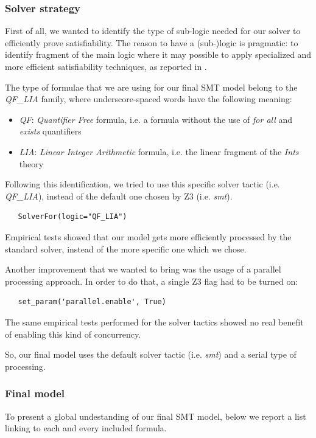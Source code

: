 \documentclass[a4paper,10pt]{article}
\begin{document}
\subsubsection{Solver strategy}
First of all, we wanted to identify the type of sub-logic needed for our solver to efficiently prove satisfiability. The reason to have a (sub-)logic is pragmatic: to identify fragment of the main logic where it may possible to apply specialized and more efficient satisfiability techniques, as reported in \cite{smt-logics}.

The type of formulae that we are using for our final SMT model belong to the \textit{QF_LIA} family, where underscore-spaced words have the following meaning:
\begin{itemize}
   \item \textit{QF}: \textit{Quantifier Free} formula, i.e. a formula without the use of \textit{for all} and \textit{exists} quantifiers
   \item \textit{LIA}: \textit{Linear Integer Arithmetic} formula, i.e. the linear fragment of the \textit{Ints} theory
\end{itemize}

Following this identification, we tried to use this specific solver tactic (i.e. \textit{QF_LIA}), instead of the default one chosen by Z3 (i.e. \textit{smt}).

\begin{verbatim}
   SolverFor(logic="QF_LIA")
\end{verbatim}

Empirical tests showed that our model gets more efficiently processed by the standard solver, instead of the more specific one which we chose.

Another improvement that we wanted to bring was the usage of a parallel processing approach. In order to do that, a single Z3 flag had to be turned on:

\begin{verbatim}
   set_param('parallel.enable', True)
\end{verbatim}

The same empirical tests performed for the solver tactics showed no real benefit of enabling this kind of concurrency. 

So, our final model uses the default solver tactic (i.e. \textit{smt}) and a serial type of processing.

\subsubsection{Final model}
To present a global undestanding of our final SMT model, below we report a list linking to each and every included formula.
\end{document}
